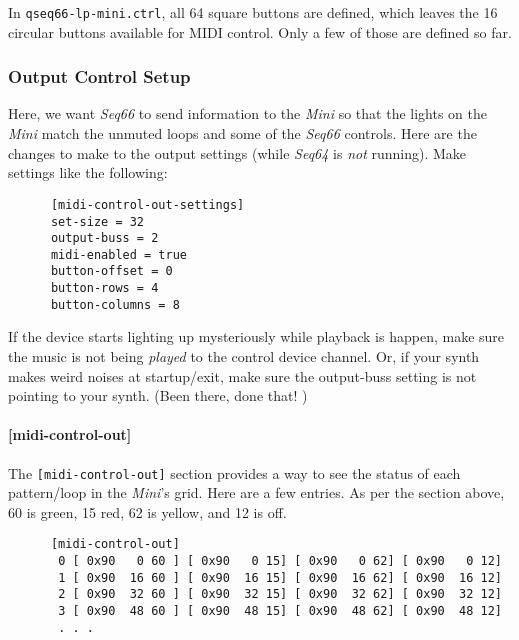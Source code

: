    In \texttt{qseq66-lp-mini.ctrl}, all 64 square buttons are defined, which
   leaves the 16 circular buttons available for MIDI control. Only a few of those
   are defined so far.

\subsubsection{Output Control Setup}
\label{subsubsec:launchpad_mini_output_control_setup}

   Here, we want \textsl{Seq66} to send information to the \textsl{Mini}
   so that the lights on the \textsl{Mini} match the unmuted loops and 
   some of the \textsl{Seq66} controls.  Here are the changes to make to the
   output settings (while \textsl{Seq64} is \textsl{not} running).
   Make settings like the following:

   \begin{verbatim}
      [midi-control-out-settings]
      set-size = 32
      output-buss = 2
      midi-enabled = true
      button-offset = 0
      button-rows = 4
      button-columns = 8
   \end{verbatim}

   If the device starts lighting up mysteriously while playback is happen, make
   sure the music is not being \textsl{played} to the control device channel.
   Or, if your synth makes weird noises at startup/exit, make
   sure the output-buss setting is not pointing to your synth.
   (Been there, done that! \smiley{})

\paragraph{[midi-control-out]}
\label{paragraph:patterns_midi_control_out}

   The \texttt{[midi-control-out]} section provides a way to see the status of
   each pattern/loop in the \textsl{Mini}'s grid.
   Here are a few entries. As per the
   section above, 60 is green, 15 red, 62 is yellow, and 12 is off.

   \begin{verbatim}
      [midi-control-out]
       0 [ 0x90   0 60 ] [ 0x90   0 15] [ 0x90   0 62] [ 0x90   0 12]
       1 [ 0x90  16 60 ] [ 0x90  16 15] [ 0x90  16 62] [ 0x90  16 12]
       2 [ 0x90  32 60 ] [ 0x90  32 15] [ 0x90  32 62] [ 0x90  32 12]
       3 [ 0x90  48 60 ] [ 0x90  48 15] [ 0x90  48 62] [ 0x90  48 12]
       . . .
   \end{verbatim}

